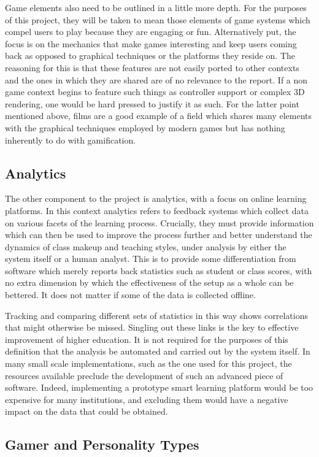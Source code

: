 \documentclass[12pt]{article}
\begin{document}
Game elements also need to be outlined in a little more depth. For the purposes of this project, they will be taken to mean those elements of game systems which compel users to play because they are engaging or fun. Alternatively put, the focus is on the mechanics that make games interesting and keep users coming back as opposed to graphical techniques or the platforms they reside on. The reasoning for this is that these features are not easily ported to other contexts and the ones in which they are shared are of no relevance to the report. If a non game context begins to feature such things as controller support or complex 3D rendering, one would be hard pressed to justify it as such. For the latter point mentioned above, films are a good example of a field which shares many elements with the graphical techniques employed by modern games but has nothing inherently to do with gamification.

\subsection{Analytics}
The other component to the project is analytics, with a focus on online learning platforms. In this context analytics refers to feedback systems which collect data on various facets of the learning process. Crucially, they must provide information which can then be used to improve the process further and better understand the dynamics of class makeup and teaching styles, under analysis by either the system itself or a human analyst. This is to provide some differentiation from software which merely reports back statistics such as student or class scores, with no extra dimension by which the effectiveness of the setup as a whole can be bettered. It does not matter if some of the data is collected offline.

Tracking and comparing different sets of statistics in this way shows correlations that might otherwise be missed. Singling out these links is the key to effective improvement of higher education. It is not required for the purposes of this definition that the analysis be automated and carried out by the system itself. In many small scale implementations, such as the one used for this project, the resources available preclude the development of such an advanced piece of software. Indeed, implementing a prototype smart learning platform would be too expensive for many institutions, and excluding them would have a negative impact on the data that could be obtained.

\subsection{Gamer and Personality Types}
\end{document}
